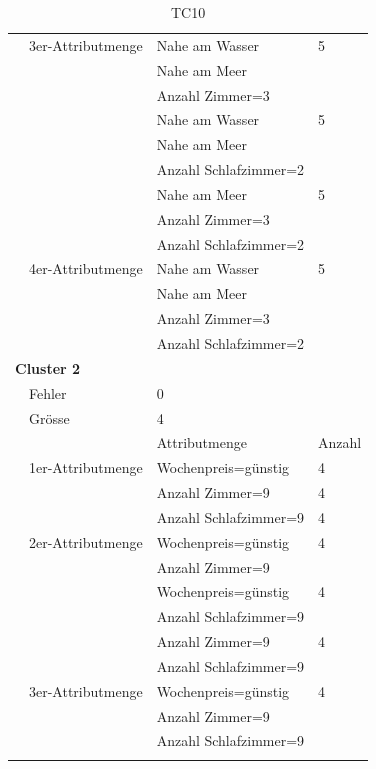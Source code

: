 \begin{longtable}{ | l | l | l | l |}
	& 3er-Attributmenge & \tabitem Nahe am Wasser & 5 \\
	& & \tabitem Nahe am Meer & \\ 
	& & \tabitem Anzahl Zimmer=3 & \\ \cline{3-4} 
	& & \tabitem Nahe am Wasser & 5 \\
	& & \tabitem Nahe am Meer & \\ 
	& & \tabitem Anzahl Schlafzimmer=2 & \\ \cline{3-4}
	& & \tabitem Nahe am Meer & 5 \\
	& & \tabitem Anzahl Zimmer=3 & \\ 
	& & \tabitem Anzahl Schlafzimmer=2 & \\ \cline{2-4}

	& 4er-Attributmenge & \tabitem Nahe am Wasser & 5 \\
	& & \tabitem Nahe am Meer & \\ 
	& & \tabitem Anzahl Zimmer=3 & \\ 
	& & \tabitem Anzahl Schlafzimmer=2 & \\ \hline

	\multicolumn{4}{|l|}{\textbf{Cluster 2}} \\ \cline{2-4} 
	& Fehler & \multicolumn{2}{|l|}{0} \\ \cline{2-4} 
	& Grösse & \multicolumn{2}{|l|}{4} \\ \cline{2-4} 
	& & Attributmenge & Anzahl \\ \cline{2-4} 
	
	& 1er-Attributmenge & \tabitem Wochenpreis=günstig & 4 \\ \cline{3-4}
	& & \tabitem Anzahl Zimmer=9 & 4 \\ \cline{3-4}
	& & \tabitem Anzahl Schlafzimmer=9 & 4 \\ \cline{2-4} 
	
	& 2er-Attributmenge & \tabitem Wochenpreis=günstig & 4 \\
	& & \tabitem Anzahl Zimmer=9 & \\ \cline{3-4}
	& & \tabitem Wochenpreis=günstig & 4 \\
	& & \tabitem Anzahl Schlafzimmer=9 & \\ \cline{3-4} 
	& & \tabitem Anzahl Zimmer=9 & 4 \\
	& & \tabitem Anzahl Schlafzimmer=9 & \\ \cline{2-4}

	& 3er-Attributmenge & \tabitem Wochenpreis=günstig & 4 \\
	& & \tabitem Anzahl Zimmer=9 & \\ 
	& & \tabitem Anzahl Schlafzimmer=9 & \\ \hline
	
	\caption{TC10}
	\centering
	\label{fig:recherche:testcases:10}
\end{longtable}


